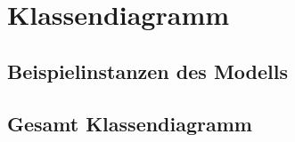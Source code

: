 
\section{Klassendiagramm}	
\hypertarget{ModelExample}{}
\subsection{Beispielinstanzen des Modells}

\begin{center}
\end{center}

\subsection{Gesamt Klassendiagramm}


	